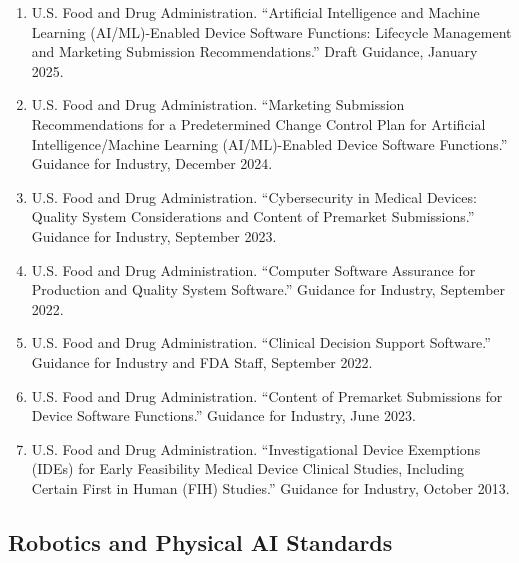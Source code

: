 \documentclass[11pt]{article}
\begin{document}
\begin{enumerate}[resume]
\item U.S. Food and Drug Administration. ``Artificial Intelligence and Machine Learning (AI/ML)-Enabled Device Software Functions: Lifecycle Management and Marketing Submission Recommendations.'' Draft Guidance, January 2025.

\item U.S. Food and Drug Administration. ``Marketing Submission Recommendations for a Predetermined Change Control Plan for Artificial Intelligence/Machine Learning (AI/ML)-Enabled Device Software Functions.'' Guidance for Industry, December 2024.

\item U.S. Food and Drug Administration. ``Cybersecurity in Medical Devices: Quality System Considerations and Content of Premarket Submissions.'' Guidance for Industry, September 2023.

\item U.S. Food and Drug Administration. ``Computer Software Assurance for Production and Quality System Software.'' Guidance for Industry, September 2022.

\item U.S. Food and Drug Administration. ``Clinical Decision Support Software.'' Guidance for Industry and FDA Staff, September 2022.

\item U.S. Food and Drug Administration. ``Content of Premarket Submissions for Device Software Functions.'' Guidance for Industry, June 2023.

\item U.S. Food and Drug Administration. ``Investigational Device Exemptions (IDEs) for Early Feasibility Medical Device Clinical Studies, Including Certain First in Human (FIH) Studies.'' Guidance for Industry, October 2013.
\end{enumerate}

\subsection*{Robotics and Physical AI Standards}
\end{document}
